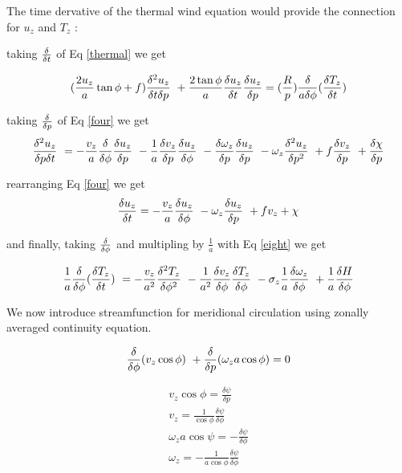 \documentclass{article}
\begin{document}
The time dervative of the thermal wind equation would provide the connection
for $u_z$ and $T_z$ :

taking $\frac{\delta}{\delta t}$ of Eq \ref{thermal} we get

\begin{equation}
(\frac{2 u_z}{a} \tan \phi + f) \frac{\delta^2 u_z}{\delta t \delta p} \
+ \frac{2 \tan \phi}{a} \frac{\delta u_z}{\delta t} \frac{\delta u_z}{\delta p} = (\frac{R}{p}) \frac{\delta}{a \delta \phi} (\frac{\delta T_z}{\delta t})
\label{six}
\end{equation}

taking $\frac{\delta}{\delta p}$ of Eq \ref{four} we get
\begin{equation}
\frac{\delta^2 u_z}{\delta p \delta t } \
= - \frac{v_z}{a} \frac{\delta}{\delta \phi} \frac{\delta u_z}{\delta p} \
- \frac{1}{a} \frac{\delta v_z}{\delta p} \frac{\delta u_z}{\delta \phi} \
- \frac{\delta \omega_z}{\delta p} \frac{\delta u_z}{\delta p} \
- \omega_z \frac{\delta^2 u_z}{\delta p^2} \
+ f \frac{\delta v_z}{\delta p} \
+ \frac{\delta \chi}{\delta p}
\label{seven}
\end{equation}

rearranging Eq \ref{four} we get
\begin{equation}
\frac{\delta u_z}{\delta t} =
- \frac{v_z}{a} \frac{\delta u_z}{\delta \phi} \
- \omega_z \frac{\delta u_z}{\delta p} \
+ fv_z + \chi
\label{eight}
\end{equation}

and finally, taking $\frac{\delta}{\delta \phi}$ and multipling by $\frac{1}{a}$ with Eq 
\ref{eight} we get

\begin{equation}
\frac{1}{a} \frac{\delta}{\delta \phi} (\frac{\delta T_z}{\delta t}) \
= - \frac{v_z}{a^2} \frac{\delta^2 T_z}{\delta \phi^2} \
- \frac{1}{a^2} \frac{\delta v_z}{\delta \phi} \frac{\delta T_z}{\delta \phi} \
- \sigma_z \frac{1}{a} \frac{\delta \omega_z}{\delta \phi} \
+ \frac{1}{a} \frac{\delta H}{\delta \phi}
\label{nine}
\end{equation}

We now introduce streamfunction for meridional circulation using zonally 
averaged continuity equation.

\begin{equation}
\frac{\delta}{\delta \phi} (v_z \cos{\phi}) \
+ \frac{\delta}{\delta p} (\omega_z a \cos \phi) = 0
\end{equation}

\begin{eqnarray}
v_z \cos \phi = \frac{\delta \psi}{\delta p}
\nonumber\\
v_z = \frac{1}{\cos \phi} \frac{\delta \psi}{\delta \phi}
\nonumber\\
\omega_z a \cos {\psi} = - \frac{\delta \psi}{\delta \phi}
\nonumber\\
\omega_z = - \frac{1}{a \cos \phi} \frac{\delta \psi}{\delta \phi}
\label{ten}
\end{eqnarray}
\end{document}
